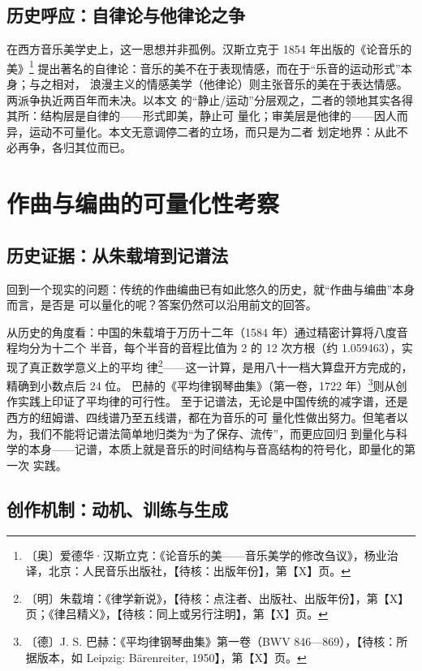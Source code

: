 \documentclass[11pt,a4paper,fontset=none]{ctexart}
\begin{document}
\subsection{历史呼应：自律论与他律论之争}

在西方音乐美学史上，这一思想并非孤例。汉斯立克于 1854 年出版的《论音乐的美》\footnote{〔奥〕爱德华·汉斯立克：《论音乐的美——音乐美学的修改刍议》，杨业治译，北京：人民音乐出版社，【待核：出版年份】，第【X】页。}
提出著名的自律论：音乐的美不在于表现情感，而在于“乐音的运动形式”本身；与之相对，
浪漫主义的情感美学（他律论）则主张音乐的美在于表达情感。两派争执近两百年而未决。以本文
的“静止/运动”分层观之，二者的领地其实各得其所：结构层是自律的——形式即美，静止可
量化；审美层是他律的——因人而异，运动不可量化。本文无意调停二者的立场，而只是为二者
划定地界：从此不必再争，各归其位而已。

\section{作曲与编曲的可量化性考察}

\subsection{历史证据：从朱载堉到记谱法}

回到一个现实的问题：传统的作曲编曲已有如此悠久的历史，就“作曲与编曲”本身而言，是否是
可以量化的呢？答案仍然可以沿用前文的回答。

从历史的角度看：中国的朱载堉于万历十二年（1584 年）通过精密计算将八度音程均分为十二个
半音，每个半音的音程比值为 2 的 12 次方根（约 1.059463），实现了真正数学意义上的平均
律\footnote{〔明〕朱载堉：《律学新说》，【待核：点注者、出版社、出版年份】，第【X】页；《律吕精义》，【待核：同上或另行注明】，第【X】页。}——这一计算，是用八十一档大算盘开方完成的，精确到小数点后 24 位。
巴赫的《平均律钢琴曲集》（第一卷，1722 年）\footnote{〔德〕J. S. 巴赫：《平均律钢琴曲集》第一卷（BWV 846—869），【待核：所据版本，如 Leipzig: Bärenreiter, 1950】，第【X】页。}则从创作实践上印证了平均律的可行性。
至于记谱法，无论是中国传统的减字谱，还是西方的纽姆谱、四线谱乃至五线谱，都在为音乐的可
量化性做出努力。但笔者以为，我们不能将记谱法简单地归类为“为了保存、流传”，而更应回归
到量化与科学的本身——记谱，本质上就是音乐的时间结构与音高结构的符号化，即量化的第一次
实践。

\subsection{创作机制：动机、训练与生成}
\end{document}
